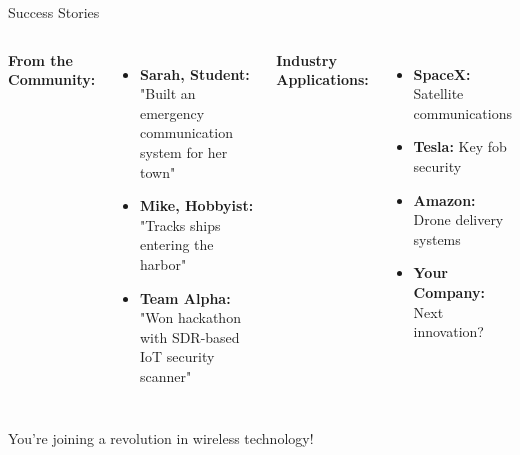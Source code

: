 \documentclass[aspectratio=169,11pt]{beamer}
\newcommand{\highlight}[1]{\colorbox{yellow!30}{#1}}
\begin{document}
\begin{frame}{Success Stories}
\begin{columns}
\textbf{\large From the Community:}
\begin{itemize}
    \item \textbf{Sarah, Student:} "Built an emergency communication system for her town"
    \item \textbf{Mike, Hobbyist:} "Tracks ships entering the harbor"
    \item \textbf{Team Alpha:} "Won hackathon with SDR-based IoT security scanner"
\end{itemize}

\textbf{\large Industry Applications:}
\begin{itemize}
    \item \textbf{SpaceX:} Satellite communications
    \item \textbf{Tesla:} Key fob security
    \item \textbf{Amazon:} Drone delivery systems
    \item \textbf{Your Company:} Next innovation?
\end{itemize}
\end{columns}
\vspace{1em}
\begin{center}
\Large\highlight{You're joining a revolution in wireless technology!}
\end{center}
\end{frame}
\end{document}
